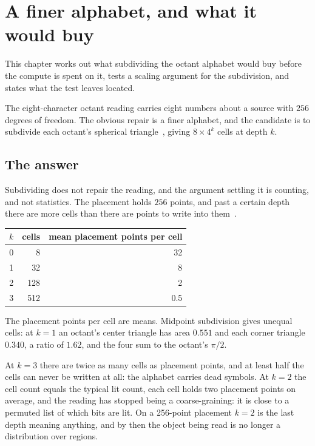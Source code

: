\chapter{A finer alphabet, and what it would buy}

This chapter works out what subdividing the octant alphabet would buy before the compute is spent on it, tests a scaling argument for the subdivision, and states what the test leaves located.

The eight-character octant reading carries eight numbers about a source with \(256\) degrees of freedom. The obvious repair is a finer alphabet, and the candidate is to subdivide each octant's spherical triangle~\cite{src:Baumgardner-and-Frederickson-1985,src:Gorski-et-al-2005}, giving \(8 \times 4^k\) cells at depth \(k\).

\section{The answer}

Subdividing does not repair the reading, and the argument settling it is counting, and not statistics. The placement holds \(256\) points, and past a certain depth there are more cells than there are points to write into them~\cite{src:Feller-1968}.

\begin{center}
\begin{tabular}{@{}rrr@{}}
\toprule
\(k\) & cells & mean placement points per cell \\
\midrule
0 & 8 & 32 \\
1 & 32 & 8 \\
2 & 128 & 2 \\
3 & 512 & 0.5 \\
\bottomrule
\end{tabular}
\end{center}

The placement points per cell are means. Midpoint subdivision gives unequal cells: at \(k = 1\) an octant's center triangle has area \(0.551\) and each corner triangle \(0.340\), a ratio of \(1.62\), and the four sum to the octant's \(\pi/2\).

At \(k = 3\) there are twice as many cells as placement points, and at least half the cells can never be written at all: the alphabet carries dead symbols. At \(k = 2\) the cell count equals the typical lit count, each cell holds two placement points on average, and the reading has stopped being a coarse-graining: it is close to a permuted list of which bits are lit. On a 256-point placement \(k = 2\) is the last depth meaning anything, and by then the object being read is no longer a distribution over regions.

